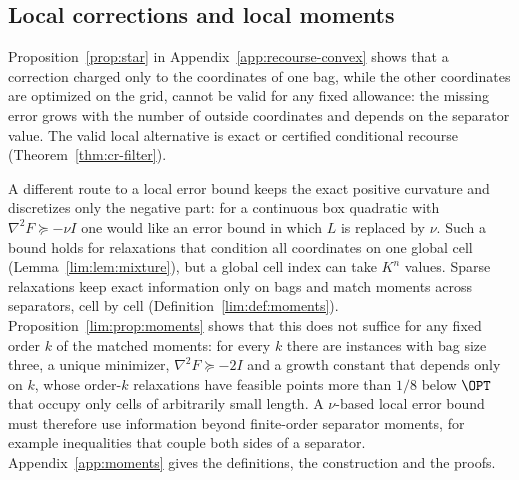 \subsection{Local corrections and local moments}\label{sec:limits-local}

Proposition~\ref{prop:star} in Appendix~\ref{app:recourse-convex} shows that
a correction charged only to the coordinates of one bag, while the other
coordinates are optimized on the grid, cannot be valid for any fixed
allowance: the missing error grows with the number of outside coordinates and
depends on the separator value. The valid local alternative is exact or
certified conditional recourse (Theorem~\ref{thm:cr-filter}).

A different route to a local error bound keeps the exact positive curvature
and discretizes only the negative part: for a continuous box quadratic with
$\nabla^2F\succeq-\nu I$ one would like an error bound in which $L$ is
replaced by $\nu$. Such a bound holds for relaxations that condition all
coordinates on one global cell (Lemma~\ref{lim:lem:mixture}), but a global
cell index can take $K^n$ values. Sparse relaxations keep exact information
only on bags and match moments across separators, cell by cell
(Definition~\ref{lim:def:moments}). Proposition~\ref{lim:prop:moments} shows
that this does not suffice for any fixed order $k$ of the matched moments: for
every $k$ there are instances with bag size three, a unique minimizer,
$\nabla^2F\succeq-2I$ and a growth constant that depends only on $k$, whose
order-$k$ relaxations have feasible points more than $1/8$ below $\OPT$ that
occupy only cells of arbitrarily small length. A $\nu$-based local error
bound must therefore use information beyond finite-order separator moments,
for example inequalities that couple both sides of a separator.
Appendix~\ref{app:moments} gives the definitions, the construction and the
proofs.
